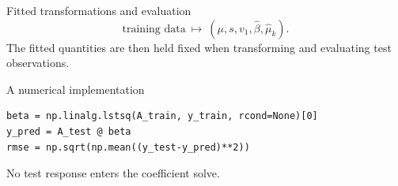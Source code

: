 \documentclass[aspectratio=169,11pt]{beamer}
\newcommand{\notestarget}{notes.pdf}\newcommand{\noteslabel}{Notes}
\begin{document}
\renewcommand{\notestarget}{notes.pdf\#note-fitted-transformations-and-evaluation}
\begin{frame}[t,fragile,label=slide-fitted-transformations-and-evaluation]{Fitted transformations and evaluation}
\[
\text{training data}\ \longmapsto\ (\mu,s,v_1,\widehat\beta,\widehat\mu_k).
\]
\pause{}
The fitted quantities are then held fixed when transforming and evaluating test observations.
\end{frame}
\renewcommand{\notestarget}{notes.pdf\#note-fitted-transformations-and-evaluation}
\begin{frame}[t,fragile,label=slide-a-numerical-implementation]{A numerical implementation}
\begin{verbatim}
beta = np.linalg.lstsq(A_train, y_train, rcond=None)[0]
y_pred = A_test @ beta
rmse = np.sqrt(np.mean((y_test-y_pred)**2))
\end{verbatim}
No test response enters the coefficient solve.
\end{frame}
\end{document}
